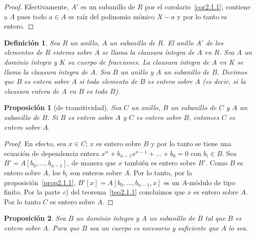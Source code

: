 \documentclass[10pt,oneside,bibtotoc,smallheadings,leqno,a5paper,DIV=12]{scrbook}
\numberwithin{equation}{section}
\theoremstyle{defi}
\newtheorem{definition}{Definici\'on}
\theoremstyle{enonce}
\newtheorem{proposition}{Proposici\'on}
\theoremstyle{rem}
\numberwithin{theorem}{section}
\numberwithin{proposition}{section}
\numberwithin{definition}{section}
\numberwithin{lemma}{section}
\numberwithin{corollary}{section}
\numberwithin{example}{section}
\numberwithin{footnote}{section}%
\begin{document}
\begin{proof}
Efectivamente, $A'$ es un subanillo de $R$ por el corolario~\ref{cor2.1.1}; contiene a $A$ pues todo $a\in A$ es
ra\'iz del polinomio m\'onico $X-a$ y por lo tanto es entero.
\end{proof}

\begin{definition}
Sea $R$ un anillo, $A$ un subanillo de $R$. El anillo $A'$ de los elementos de $R$ enteros sobre $A$ se
llama la \emph{clausura \'integra} de $A$ en $R$. Sea $A$ un dominio \'integro y $K$ su cuerpo de fracciones. La clausura
\'integra de $A$ en $K$ se llama la clausura \'integra de $A$.
Sea $B$ un anillo y $A$ un subanillo de $B$. Decimos
que $B$ es \emph{entero} sobre $A$ si todo elemento de $B$ es entero sobre $A$ (es decir, si la clausura
entera de $A$ en $B$ es todo $B$).
\end{definition}

\begin{proposition}[de transitividad]\label{prop2.1.2}
Sea $C$ un anillo, $B$ un subanillo de $C$ y $A$ un subanillo de $B$. Si $B$ es entero sobre $A$ y $C$ es
entero sobre $B$, entonces $C$ es entero sobre $A$.
\end{proposition}

\begin{proof}
En efecto, sea $x\in C$; $x$ es entero sobre $B$ y por lo tanto se tiene una ecuaci\'on de dependencia entera
$x^{n}+b_{n-1}x^{n-1}+\dots+b_{0} = 0$ con $b_{i}\in B$. Sea $B' = A[b_{0},\dots,b_{n-1}]$, de manera que $x$
tambi\'en es entero sobre $B'$. Como $B$ es entero sobre $A$, los $b_{i}$ son enteros sobre
$A$. Por lo tanto, por la proposici\'on~\ref{prop2.1.1},
$B'[x] = A[b_{0},\dots,b_{n-1},x]$ es un $A$-m\'odulo de tipo finito. Por la parte
{\itshape c}) del teorema~\ref{teo2.1.1}
concluimos que $x$ es entero sobre $A$. Por lo tanto $C$ es entero sobre $A$.
\end{proof}

\begin{proposition}\label{prop2.1.3}
Sea $B$ un dominio \'integro y $A$ un subanillo de $B$ tal que $B$ es entero sobre $A$. Para que $B$ sea
un cuerpo es necesario y suficiente que $A$ lo sea.
\end{proposition}
\end{document}
